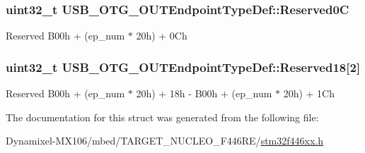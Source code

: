 \subsubsection[{\texorpdfstring{Reserved0C}{Reserved0C}}]{\setlength{\rightskip}{0pt plus 5cm}uint32\+\_\+t U\+S\+B\+\_\+\+O\+T\+G\+\_\+\+O\+U\+T\+Endpoint\+Type\+Def\+::\+Reserved0C}\hypertarget{struct_u_s_b___o_t_g___o_u_t_endpoint_type_def_a1d7bc9b546c4dd8ce2fe792945cf7a9d}{}\label{struct_u_s_b___o_t_g___o_u_t_endpoint_type_def_a1d7bc9b546c4dd8ce2fe792945cf7a9d}
Reserved B00h + (ep\+\_\+num $\ast$ 20h) + 0\+Ch 
\subsubsection[{\texorpdfstring{Reserved18}{Reserved18}}]{\setlength{\rightskip}{0pt plus 5cm}uint32\+\_\+t U\+S\+B\+\_\+\+O\+T\+G\+\_\+\+O\+U\+T\+Endpoint\+Type\+Def\+::\+Reserved18\mbox{[}2\mbox{]}}\hypertarget{struct_u_s_b___o_t_g___o_u_t_endpoint_type_def_a51b162457add1bb7cc254b7aeb9f94bd}{}\label{struct_u_s_b___o_t_g___o_u_t_endpoint_type_def_a51b162457add1bb7cc254b7aeb9f94bd}
Reserved B00h + (ep\+\_\+num $\ast$ 20h) + 18h -\/ B00h + (ep\+\_\+num $\ast$ 20h) + 1\+Ch 

The documentation for this struct was generated from the following file\+:\begin{DoxyCompactItemize}
\item 
Dynamixel-\/\+M\+X106/mbed/\+T\+A\+R\+G\+E\+T\+\_\+\+N\+U\+C\+L\+E\+O\+\_\+\+F446\+R\+E/\hyperlink{stm32f446xx_8h}{stm32f446xx.\+h}\end{DoxyCompactItemize}
